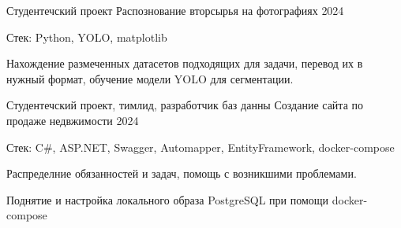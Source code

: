 \begin{cventries}
  \cventry
    {Студентечский проект} %
    {Распознование вторсырья на фотографиях} %
    {} %
    {2024} %
    {
      \begin{cvitems} %
        \item {Стек: Python, YOLO, matplotlib}
        \item {Нахождение размеченных датасетов подходящих для задачи, перевод их в нужный формат, обучение модели YOLO для сегментации.}
      \end{cvitems}
    }

  \cventry
    {Студентечский проект, тимлид, разработчик баз данны} %
    {Создание сайта по продаже недвжимости} %
    {} %
    {2024} %
    {
      \begin{cvitems} %
        \item {Стек: C\#, ASP.NET, Swagger, Automapper, EntityFramework, docker-compose}
        \item {Распределние обязанностей и задач, помощь с возникшими проблемами.}
        \item {Поднятие и настройка локального образа PostgreSQL при помощи docker-compose}
      \end{cvitems}
    }
\end{cventries}
